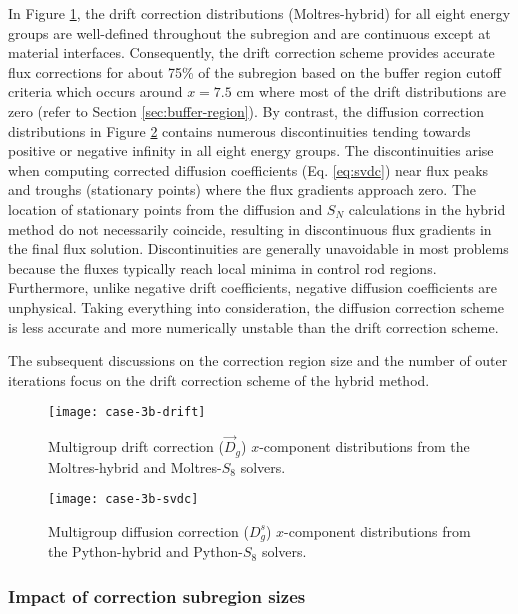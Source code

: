 In Figure \ref{fig:3b-drift}, the drift
correction distributions (Moltres-hybrid) for all eight energy groups are well-defined throughout
the subregion and are continuous except at material interfaces. Consequently, the drift correction
scheme provides accurate flux corrections for about 75\% of the subregion based on the buffer
region cutoff criteria which occurs around $x=7.5$ cm where most of the drift distributions are
zero (refer to Section \ref{sec:buffer-region}). By contrast, the diffusion correction
distributions in Figure \ref{fig:3b-svdc} contains numerous discontinuities tending towards
positive or negative infinity in all eight energy groups. The discontinuities arise when
computing corrected diffusion coefficients (Eq. \ref{eq:svdc}) near flux peaks and troughs
(stationary points) where the flux gradients approach zero. The location of stationary points from
the diffusion and $S_N$ calculations in the hybrid method do not necessarily coincide, resulting in
discontinuous flux gradients in the final flux solution. Discontinuities are generally unavoidable
in most problems because the fluxes typically reach local minima in control rod regions.
Furthermore, unlike negative drift coefficients, negative diffusion coefficients are unphysical.
Taking everything into consideration, the diffusion correction scheme is less accurate and more
numerically unstable than the drift correction scheme.

The subsequent discussions on the correction region size and the number of outer
iterations focus on the drift correction scheme of the hybrid method.

\begin{figure}[htb!]
  \centering
  \texttt{[image: case-3b-drift]}
  \caption{Multigroup drift correction ($\vec{D}_g$) $x$-component distributions from the
  Moltres-hybrid and Moltres-$S_8$ solvers.}
  \label{fig:3b-drift}
\end{figure}

\begin{figure}[htb!]
  \centering
  \texttt{[image: case-3b-svdc]}
  \caption{Multigroup diffusion correction ($D^s_g$) $x$-component distributions from the
    Python-hybrid and Python-$S_8$ solvers.}
  \label{fig:3b-svdc}
\end{figure}

\FloatBarrier

\subsubsection{Impact of correction subregion sizes}

